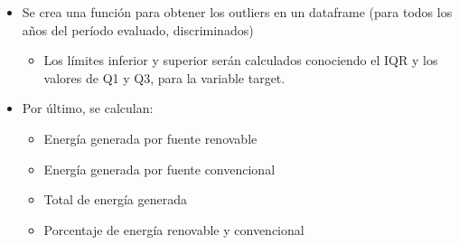 \documentclass[11pt]{article}
\providecommand{\tightlist}{%
      \setlength{\itemsep}{0pt}\setlength{\parskip}{0pt}}
\begin{document}
    \begin{itemize}
\tightlist
\item
  Se crea una función para obtener los outliers en un dataframe (para
  todos los años del período evaluado, discriminados)

  \begin{itemize}
  \tightlist
  \item
    Los límites inferior y superior serán calculados conociendo el IQR y
    los valores de Q1 y Q3, para la variable target.
  \end{itemize}
\item
  Por último, se calculan:

  \begin{itemize}
  \tightlist
  \item
    Energía generada por fuente renovable
  \item
    Energía generada por fuente convencional
  \item
    Total de energía generada
  \item
    Porcentaje de energía renovable y convencional
  \end{itemize}
\end{itemize}
\end{document}
